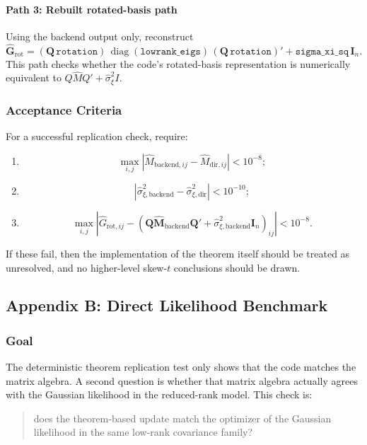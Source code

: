 \documentclass[11pt]{article}
\newcommand{\bQ}{\mathbf{Q}}
\newcommand{\bG}{\mathbf{G}}
\newcommand{\bM}{\mathbf{M}}
\newcommand{\diag}{\operatorname{diag}}
\newcommand{\I}{\mathbf{I}}
\begin{document}
\paragraph{Path 3: Rebuilt rotated-basis path}
Using the backend output only, reconstruct
\[
\widehat{\bG}_{\mathrm{rot}}
=
(\bQ \,\texttt{rotation})\,
\diag(\texttt{lowrank\_eigs})\,
(\bQ \,\texttt{rotation})'
+
\texttt{sigma\_xi\_sq}\,\I_n.
\]
This path checks whether the code's rotated-basis representation is numerically
equivalent to \(Q \widehat M Q' + \widehat{\sigma}_\xi^2 I\).

\subsubsection{Acceptance Criteria}

For a successful replication check, require:

\begin{enumerate}[label=\arabic*.]
\item
\[
\max_{i,j}
\left|
\widehat M_{\mathrm{backend},ij}
-
\widehat M_{\mathrm{dir},ij}
\right|
< 10^{-8};
\]
\item
\[
\left|
\widehat{\sigma}_{\xi,\mathrm{backend}}^2
-
\widehat{\sigma}_{\xi,\mathrm{dir}}^2
\right|
< 10^{-10};
\]
\item
\[
\max_{i,j}
\left|
\widehat G_{\mathrm{rot},ij}
-
\left(
\bQ \widehat{\bM}_{\mathrm{backend}} \bQ' +
\widehat{\sigma}_{\xi,\mathrm{backend}}^2 \I_n
\right)_{ij}
\right|
< 10^{-8}.
\]
\end{enumerate}

If these fail, then the implementation of the theorem itself should be treated
as unresolved, and no higher-level skew-$t$ conclusions should be drawn.

\subsection{Appendix B: Direct Likelihood Benchmark}

\subsubsection{Goal}

The deterministic theorem replication test only shows that the code matches the
matrix algebra. A second question is whether that matrix algebra actually agrees
with the Gaussian likelihood in the reduced-rank model. This check is:

\begin{quote}
does the theorem-based update match the optimizer of the Gaussian likelihood in
the same low-rank covariance family?
\end{quote}
\end{document}
